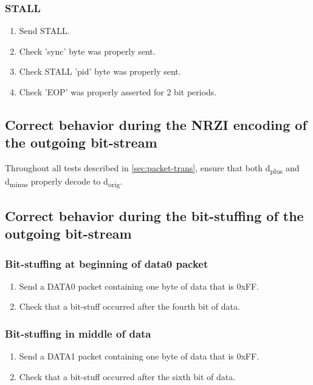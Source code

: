 \documentclass{scrartcl}
\begin{document}
		\subsubsection{STALL}
			\begin{enumerate}
            	\item Send STALL.
                \item Check 'sync' byte was properly sent.
                \item Check STALL 'pid' byte was properly sent.
                \item Check 'EOP' was properly asserted for 2 bit periods.
            \end{enumerate}
	
	\subsection{Correct behavior during the NRZI encoding of the outgoing bit-stream}
		Throughout all tests described in \autoref{sec:packet-trans}, ensure that both d\textsubscript{plus} and d\textsubscript{minus} properly decode to d\textsubscript{orig}.

	\subsection{Correct behavior during the bit-stuffing of the outgoing bit-stream}
		\subsubsection{Bit-stuffing at beginning of data0 packet}
        	\begin{enumerate}
            	\item Send a DATA0 packet containing one byte of data that is 0xFF.
                \item Check that a bit-stuff occurred after the fourth bit of data.
            \end{enumerate}
		\subsubsection{Bit-stuffing in middle of data}
        	\begin{enumerate}
            	\item Send a DATA1 packet containing one byte of data that is 0xFF.
                \item Check that a bit-stuff occurred after the sixth bit of data.
            \end{enumerate}
\end{document}
